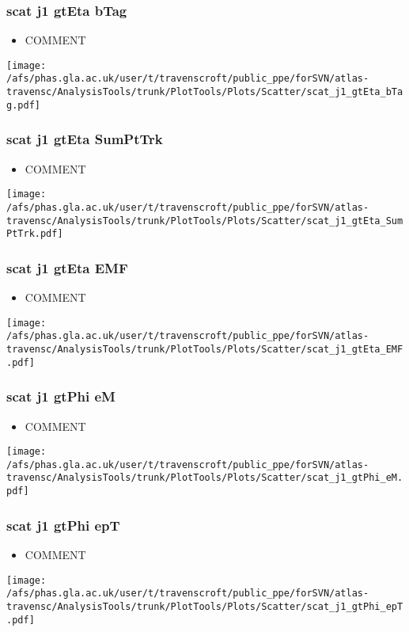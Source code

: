 \documentclass{beamer}
\begin{document}
\begin{frame}
\frametitle{scat j1 gtEta bTag}
\begin{itemize}
\item COMMENT
\end{itemize}
\begin{center}
\texttt{[image: /afs/phas.gla.ac.uk/user/t/travenscroft/public\_ppe/forSVN/atlas-travensc/AnalysisTools/trunk/PlotTools/Plots/Scatter/scat\_j1\_gtEta\_bTag.pdf]}
\end{center}
\end{frame}

\begin{frame}
\frametitle{scat j1 gtEta SumPtTrk}
\begin{itemize}
\item COMMENT
\end{itemize}
\begin{center}
\texttt{[image: /afs/phas.gla.ac.uk/user/t/travenscroft/public\_ppe/forSVN/atlas-travensc/AnalysisTools/trunk/PlotTools/Plots/Scatter/scat\_j1\_gtEta\_SumPtTrk.pdf]}
\end{center}
\end{frame}

\begin{frame}
\frametitle{scat j1 gtEta EMF}
\begin{itemize}
\item COMMENT
\end{itemize}
\begin{center}
\texttt{[image: /afs/phas.gla.ac.uk/user/t/travenscroft/public\_ppe/forSVN/atlas-travensc/AnalysisTools/trunk/PlotTools/Plots/Scatter/scat\_j1\_gtEta\_EMF.pdf]}
\end{center}
\end{frame}

\begin{frame}
\frametitle{scat j1 gtPhi eM}
\begin{itemize}
\item COMMENT
\end{itemize}
\begin{center}
\texttt{[image: /afs/phas.gla.ac.uk/user/t/travenscroft/public\_ppe/forSVN/atlas-travensc/AnalysisTools/trunk/PlotTools/Plots/Scatter/scat\_j1\_gtPhi\_eM.pdf]}
\end{center}
\end{frame}

\begin{frame}
\frametitle{scat j1 gtPhi epT}
\begin{itemize}
\item COMMENT
\end{itemize}
\begin{center}
\texttt{[image: /afs/phas.gla.ac.uk/user/t/travenscroft/public\_ppe/forSVN/atlas-travensc/AnalysisTools/trunk/PlotTools/Plots/Scatter/scat\_j1\_gtPhi\_epT.pdf]}
\end{center}
\end{frame}
\end{document}

